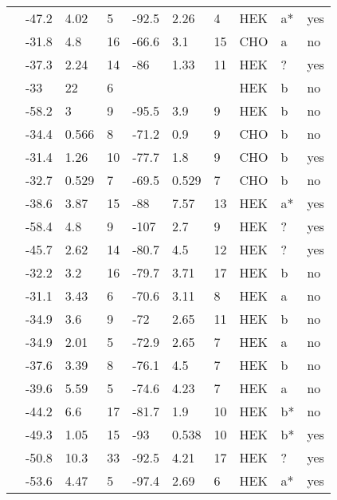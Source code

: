 \begin{longtable}{p{6cm}|lll|lll|lll}
\citet{Baroudi2001MutationDB} & -47.2 & 4.02 & 5 & -92.5 & 2.26 & 4 & HEK & a* & yes \\
\citet{Bebarova2008MutationDB} & -31.8 & 4.8 & 16 & -66.6 & 3.1 & 15 & CHO & a & no \\
\citet{Beckermann2014MutationDB} & -37.3 & 2.24 & 14 & -86 & 1.33 & 11 & HEK & ? & yes \\
\citet{Beyder2010MutationDB} & -33 & 22 & 6 & && & HEK & b & no \\
\citet{Beyder2014MutationDB} & -58.2 & 3 & 9 & -95.5 & 3.9 & 9 & HEK & b & no \\
\citet{Calloe2011MutationDB} & -34.4 & 0.566 & 8 & -71.2 & 0.9 & 9 & CHO & b & no \\
\citet{Calloe2011MutationDB} & -31.4 & 1.26 & 10 & -77.7 & 1.8 & 9 & CHO & b & yes \\
\citet{Calloe2013MutationDB} & -32.7 & 0.529 & 7 & -69.5 & 0.529 & 7 & CHO & b & no \\
\citet{Casini2007MutationDB} & -38.6 & 3.87 & 15 & -88 & 7.57 & 13 & HEK & a* & yes \\
\citet{Chang2004MutationDB} & -58.4 & 4.8 & 9 & -107 & 2.7 & 9 & HEK & ? & yes \\
\citet{Chen2016MutationDB} & -45.7 & 2.62 & 14 & -80.7 & 4.5 & 12 & HEK & ? & yes \\
\citet{Cheng2010MutationDB} & -32.2 & 3.2 & 16 & -79.7 & 3.71 & 17 & HEK & b & no \\
\citet{Cheng2010MutationDB} & -31.1 & 3.43 & 6 & -70.6 & 3.11 & 8 & HEK & a & no \\
\citet{Cheng2010MutationDB} & -34.9 & 3.6 & 9 & -72 & 2.65 & 11 & HEK & b & no \\
\citet{Cheng2010MutationDB} & -34.9 & 2.01 & 5 & -72.9 & 2.65 & 7 & HEK & a & no \\
\citet{Cheng2011MutationDB} & -37.6 & 3.39 & 8 & -76.1 & 4.5 & 7 & HEK & b & no \\
\citet{Cheng2011MutationDB} & -39.6 & 5.59 & 5 & -74.6 & 4.23 & 7 & HEK & a & no \\
\citet{Clatot2012MutationDB} & -44.2 & 6.6 & 17 & -81.7 & 1.9 & 10 & HEK & b* & no \\
\citet{Cordeiro2006MutationDB} & -49.3 & 1.05 & 15 & -93 & 0.538 & 10 & HEK & b* & yes \\
\citet{Crotti2012aMutationDB} & -50.8 & 10.3 & 33 & -92.5 & 4.21 & 17 & HEK & ? & yes \\
\citet{Deschenes2000MutationDB} & -53.6 & 4.47 & 5 & -97.4 & 2.69 & 6 & HEK & a* & yes \\

\end{longtable}
